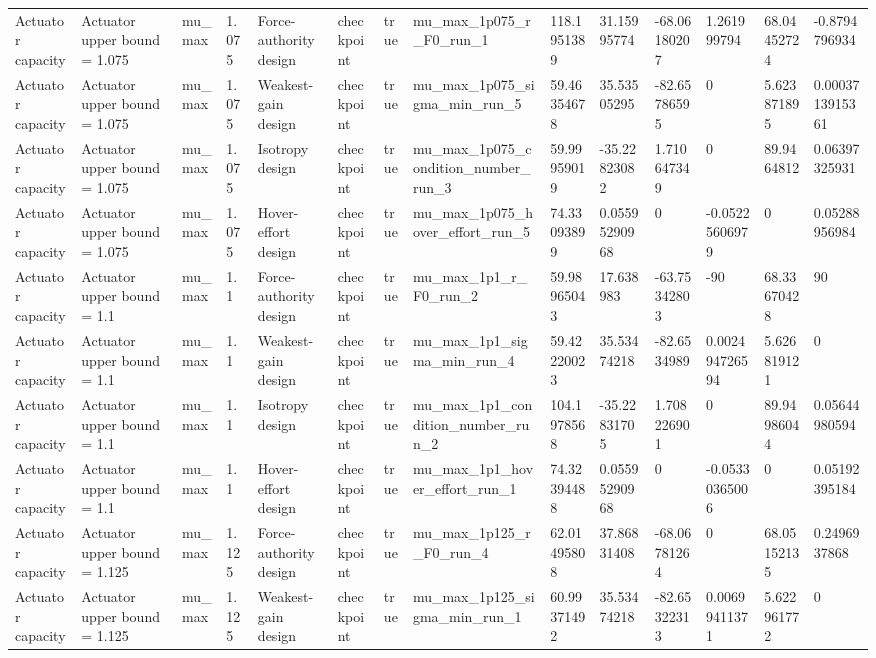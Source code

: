 \begin{tabular}{@{}llllllllllllll@{}}
Actuator capacity & Actuator upper bound = 1.075 & mu\_max & 1.075 & Force-authority design & checkpoint & true & mu\_max\_1p075\_r\_F0\_run\_1 & 118.1951389 & 31.15995774 & -68.06180207 & 1.261999794 & 68.04452724 & -0.8794796934 \\
Actuator capacity & Actuator upper bound = 1.075 & mu\_max & 1.075 & Weakest-gain design & checkpoint & true & mu\_max\_1p075\_sigma\_min\_run\_5 & 59.46354678 & 35.53505295 & -82.65786595 & 0 & 5.623871895 & 0.0003713915361 \\
Actuator capacity & Actuator upper bound = 1.075 & mu\_max & 1.075 & Isotropy design & checkpoint & true & mu\_max\_1p075\_condition\_number\_run\_3 & 59.99959019 & -35.22823082 & 1.710647349 & 0 & 89.9464812 & 0.06397325931 \\
Actuator capacity & Actuator upper bound = 1.075 & mu\_max & 1.075 & Hover-effort design & checkpoint & true & mu\_max\_1p075\_hover\_effort\_run\_5 & 74.33093899 & 0.05595290968 & 0 & -0.05225606979 & 0 & 0.05288956984 \\
Actuator capacity & Actuator upper bound = 1.1 & mu\_max & 1.1 & Force-authority design & checkpoint & true & mu\_max\_1p1\_r\_F0\_run\_2 & 59.98965043 & 17.638983 & -63.75342803 & -90 & 68.33670428 & 90 \\
Actuator capacity & Actuator upper bound = 1.1 & mu\_max & 1.1 & Weakest-gain design & checkpoint & true & mu\_max\_1p1\_sigma\_min\_run\_4 & 59.42220023 & 35.53474218 & -82.6534989 & 0.002494726594 & 5.626819121 & 0 \\
Actuator capacity & Actuator upper bound = 1.1 & mu\_max & 1.1 & Isotropy design & checkpoint & true & mu\_max\_1p1\_condition\_number\_run\_2 & 104.1978568 & -35.22831705 & 1.708226901 & 0 & 89.94986044 & 0.05644980594 \\
Actuator capacity & Actuator upper bound = 1.1 & mu\_max & 1.1 & Hover-effort design & checkpoint & true & mu\_max\_1p1\_hover\_effort\_run\_1 & 74.32394488 & 0.05595290968 & 0 & -0.05330365006 & 0 & 0.05192395184 \\
Actuator capacity & Actuator upper bound = 1.125 & mu\_max & 1.125 & Force-authority design & checkpoint & true & mu\_max\_1p125\_r\_F0\_run\_4 & 62.01495808 & 37.86831408 & -68.06781264 & 0 & 68.05152135 & 0.2496937868 \\
Actuator capacity & Actuator upper bound = 1.125 & mu\_max & 1.125 & Weakest-gain design & checkpoint & true & mu\_max\_1p125\_sigma\_min\_run\_1 & 60.99371492 & 35.53474218 & -82.65322313 & 0.00699411371 & 5.622961772 & 0 \\

\end{tabular}
